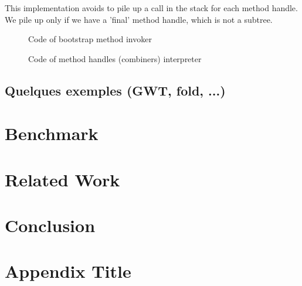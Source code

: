 \documentclass{sigplanconf}
\begin{document}
    This implementation avoids to pile up a call in the stack for each method handle.
    We pile up only if we have a 'final' method handle, which is not a subtree.

    \begin{figure}[!h]
      
      \caption{Code of bootstrap method invoker}
      \label{intepret}
    \end{figure}

    \begin{figure}[!h]
      
      \caption{Code of method handles (combiners) interpreter}
      \label{intepret}
    \end{figure}

  \subsection{Quelques exemples (GWT, fold, ...)}

\section{Benchmark}  

\section{Related Work}

\section{Conclusion}

\begin{figure}
  
  \caption{}
\end{figure}

\begin{figure}
  
  \caption{}
\end{figure}

\begin{figure}
  
  \caption{}
\end{figure}

\begin{figure}
  
  \caption{}
\end{figure}


\appendix
\section{Appendix Title}
\end{document}
